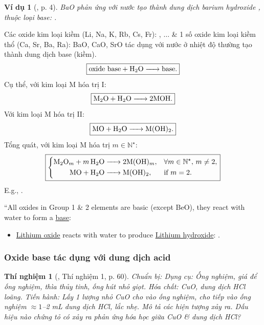 \documentclass{article}
\newtheorem{thinghiem}{Thí nghiệm}
\newtheorem{vidu}{Ví dụ}
\begin{document}
\begin{vidu}[\cite{SGK_Hoa_Hoc_9}, p. 4]
	{\rm BaO} phản ứng với nước tạo thành dung dịch {\rm barium hydroxide }, thuộc loại base: {\rm{}}.
\end{vidu}
Các oxide kim loại kiềm (Li, Na, K, Rb, Cs, Fr): , $\ldots$ \& 1 số oxide kim loại kiềm thổ (Ca, Sr, Ba, Ra): BaO, CaO, SrO tác dụng với nước ở nhiệt độ thường tạo thành dung dịch base (kiềm).
\begin{align*}
	\boxed{\mbox{oxide base} + \ce{H2O ->} \mbox{base}.}
\end{align*}
Cụ thể, với kim loại M hóa trị I:
\begin{align*}
	\boxed{\ce{M2O + H2O -> $2$MOH}.}
\end{align*}
Với kim loại M hóa trị II:
\begin{align*}
	\boxed{\ce{MO + H2O -> M(OH)2}.}
\end{align*}
Tổng quát, với kim loại M hóa trị $m\in\mathbb{N}^\star$:
\begin{equation*}
	\boxed{\left\{\begin{split}
		\ce{M2O_m + $m$H2O &-> $2$M(OH)_m},&&\forall m\in\mathbb{N}^\star,\,m\ne2,\\
		\ce{MO + H2O &-> M(OH)2},&&\mbox{if } m = 2.
	\end{split}\right.}
\end{equation*}
E.g., .

``All oxides in Group 1 \& 2 elements are basic (except BeO), they react with water to form a \href{https://en.wikipedia.org/wiki/Base_(chemistry)}{base}:
\begin{itemize}
	\item \href{https://en.wikipedia.org/wiki/Lithium_oxide}{Lithium oxide} reacts with water to produce \href{https://en.wikipedia.org/wiki/Lithium_hydroxide}{Lithium hydroxide}: .
\end{itemize}

\subsubsection{Oxide base tác dụng với dung dịch acid}

\begin{thinghiem}[\cite{SGK_KHTN_8_Canh_Dieu}, Thí nghiệm 1, p. 60]
	{\rm Chuẩn bị:} Dụng cụ: Ống nghiệm, giá để ống nghiệm, thìa thủy tinh, ống hút nhỏ giọt. Hóa chất: {\rm CuO}, dung dịch {\rm HCl} loãng. {\rm Tiến hành:} Lấy 1 lượng nhỏ {\rm CuO} cho vào ống nghiệm, cho tiếp vào ống nghiệm $\approx1$--{\rm2 mL} dung dịch {\rm HCl}, lắc nhẹ. Mô tả các hiện tượng xảy ra. Dấu hiệu nào chứng tỏ có xảy ra phản ứng hóa học giữa {\rm CuO} \& dung dịch {\rm HCl}?
\end{thinghiem}
\end{document}
